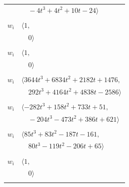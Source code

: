 \documentclass[11pt]{article}
\begin{document}
\begin{longtable}{@{}ll@{}}
 & $\quad -4t^{3}+4t^{2}+10t-24\rangle$\\
\addlinespace[2pt]
\multicolumn{2}{@{}p{0.97\textwidth}@{}}{$i=30$, $D_i=1$, $e_i=0$, $\rho_{ij}$: $--$}\\
$w_i$ & $\langle 1,$\\
 & $\quad 0\rangle$\\
\addlinespace[2pt]
\multicolumn{2}{@{}p{0.97\textwidth}@{}}{$i=31$, $D_i=1$, $e_i=0$, $\rho_{ij}$: $--$}\\
$w_i$ & $\langle 1,$\\
 & $\quad 0\rangle$\\
\addlinespace[2pt]
\multicolumn{2}{@{}p{0.97\textwidth}@{}}{$i=32$, $D_i=1$, $\rho_{ij}$: $0{:}2, \allowbreak 4{:}1, \allowbreak 6{:}2, \allowbreak 8{:}2, \allowbreak 11{:}2, \allowbreak 14{:}2, \allowbreak 18{:}2, \allowbreak 24{:}2, \allowbreak 34{:}1, \allowbreak 51{:}2, \allowbreak 56{:}2, \allowbreak 59{:}1, \allowbreak 60{:}1, \allowbreak 61{:}2$}\\
$w_i$ & $\langle 3644t^{3}+6834t^{2}+2182t+1476,$\\
 & $\quad 292t^{3}+4164t^{2}+4838t-2586\rangle$\\
\addlinespace[2pt]
\multicolumn{2}{@{}p{0.97\textwidth}@{}}{$i=33$, $D_i=1$, $\rho_{ij}$: $6{:}1, \allowbreak 19{:}2, \allowbreak 20{:}2, \allowbreak 37{:}2, \allowbreak 38{:}1, \allowbreak 42{:}2, \allowbreak 56{:}2, \allowbreak 64{:}2, \allowbreak 68{:}2, \allowbreak 71{:}1, \allowbreak 82{:}1$}\\
$w_i$ & $\langle -282t^{3}+158t^{2}+733t+51,$\\
 & $\quad -204t^{3}-473t^{2}+386t+621\rangle$\\
\addlinespace[2pt]
\multicolumn{2}{@{}p{0.97\textwidth}@{}}{$i=34$, $D_i=1$, $\rho_{ij}$: $9{:}1, \allowbreak 13{:}2, \allowbreak 18{:}1, \allowbreak 32{:}2, \allowbreak 36{:}1, \allowbreak 41{:}1, \allowbreak 56{:}1, \allowbreak 65{:}2, \allowbreak 74{:}1, \allowbreak 84{:}2, \allowbreak 97{:}1$}\\
$w_i$ & $\langle 85t^{3}+83t^{2}-187t-161,$\\
 & $\quad 80t^{3}-119t^{2}-206t+65\rangle$\\
\addlinespace[2pt]
\multicolumn{2}{@{}p{0.97\textwidth}@{}}{$i=35$, $D_i=1$, $\rho_{ij}$: $--$}\\
$w_i$ & $\langle 1,$\\
 & $\quad 0\rangle$\\
\addlinespace[2pt]
\multicolumn{2}{@{}p{0.97\textwidth}@{}}{$i=36$, $D_i=1$, $\rho_{ij}$: $3{:}2, \allowbreak 6{:}1, \allowbreak 8{:}2, \allowbreak 9{:}1, \allowbreak 14{:}1, \allowbreak 16{:}2, \allowbreak 34{:}2, \allowbreak 40{:}2, \allowbreak 60{:}2, \allowbreak 61{:}2, \allowbreak 63{:}1, \allowbreak 68{:}2, \allowbreak 78{:}2, \allowbreak 81{:}1, \allowbreak 96{:}2$}\\

\end{longtable}
\end{document}
